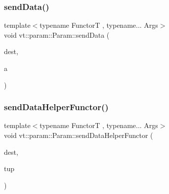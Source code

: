 \subsubsection{\texorpdfstring{send\+Data()}{sendData()}\hspace{0.1cm}{\footnotesize\ttfamily [7/7]}}
{\footnotesize\ttfamily template$<$typename FunctorT , typename... Args$>$ \\
void vt\+::param\+::\+Param\+::send\+Data (\begin{DoxyParamCaption}\item[{\hyperlink{namespacevt_a866da9d0efc19c0a1ce79e9e492f47e2}{Node\+Type} const \&}]{dest,  }\item[{Args \&\&...}]{a }\end{DoxyParamCaption})\hspace{0.3cm}{\ttfamily [inline]}}

\mbox{\label{structvt_1_1param_1_1_param_a51452ecb0d885e4a3755df33657d613e}} 
\subsubsection{\texorpdfstring{send\+Data\+Helper\+Functor()}{sendDataHelperFunctor()}}
{\footnotesize\ttfamily template$<$typename FunctorT , typename... Args$>$ \\
void vt\+::param\+::\+Param\+::send\+Data\+Helper\+Functor (\begin{DoxyParamCaption}\item[{\hyperlink{namespacevt_a866da9d0efc19c0a1ce79e9e492f47e2}{Node\+Type} const \&}]{dest,  }\item[{std\+::tuple$<$ Args... $>$ \&\&}]{tup }\end{DoxyParamCaption})\hspace{0.3cm}{\ttfamily [inline]}}

\mbox{\label{structvt_1_1param_1_1_param_a5a4f7cdd18507a9012936f138397d075}} 
